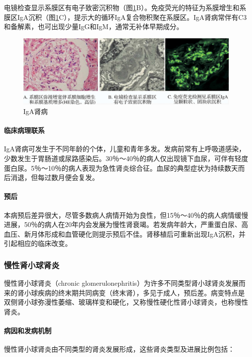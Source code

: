 电镜检查显示系膜区有电子致密沉积物（图\ref{fig10-22}B）。免疫荧光的特征为系膜增生和系膜区IgA沉积（图\ref{fig10-22}C），提示大的循环IgA复合物积聚在系膜区。IgA肾病常伴有C3和备解素，也可出现少量IgG和IgM，通常无补体早期成分。

\begin{figure}[!htbp]
 \centering
 \includegraphics{./images/Image00170.jpg}
 \captionsetup{justification=centering}
 \caption{IgA肾病}
 \label{fig10-22}
  \end{figure} 

\paragraph{临床病理联系}
IgA肾病可发生于不同年龄的个体，儿童和青年多发。发病前常有上呼吸道感染，少数发生于胃肠道或尿路感染后。30％～40％的病人仅出现镜下血尿，可伴有轻度蛋白尿。5％～10％的病人表现为急性肾炎综合征。血尿的典型症状为持续数天而后消退，但每过数月便会复发。

\paragraph{预后}
本病预后差异很大，尽管多数病人病情开始为良性，但15％～40％的病人病情缓慢进展，50％的病人在20年内会发展为慢性肾衰竭。若发病年龄大，严重蛋白尿、高血压、新月体形成和血管硬化则提示预后不佳。肾移植后可重新出现IgA沉积，并引起相应的临床改变。

\subsubsection{慢性肾小球肾炎}

慢性肾小球肾炎（chronic
glomerulonephritis）为许多不同类型肾小球肾炎发展而来的肾小球疾病的终末期共同病变（终末肾），多见于成人，预后差。病变特点是双侧肾小球弥漫性萎缩、玻璃样变和硬化，又称慢性硬化性肾小球肾炎，也称慢性肾炎。

\paragraph{病因和发病机制}
慢性肾小球肾炎由不同类型的肾炎发展形成，这些肾炎类型及进展比例包括：

